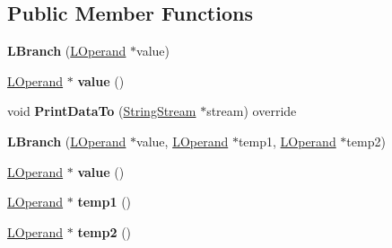 \subsection*{Public Member Functions}
\begin{DoxyCompactItemize}
\item 
{\bfseries L\+Branch} (\hyperlink{classv8_1_1internal_1_1_l_operand}{L\+Operand} $\ast$value)\hypertarget{classv8_1_1internal_1_1_l_branch_a47585b11adebace773ab1767c3882566}{}\label{classv8_1_1internal_1_1_l_branch_a47585b11adebace773ab1767c3882566}

\item 
\hyperlink{classv8_1_1internal_1_1_l_operand}{L\+Operand} $\ast$ {\bfseries value} ()\hypertarget{classv8_1_1internal_1_1_l_branch_ac4159865cc8843892cf7ee698ec9a586}{}\label{classv8_1_1internal_1_1_l_branch_ac4159865cc8843892cf7ee698ec9a586}

\item 
void {\bfseries Print\+Data\+To} (\hyperlink{classv8_1_1internal_1_1_string_stream}{String\+Stream} $\ast$stream) override\hypertarget{classv8_1_1internal_1_1_l_branch_a2b22ae6b02ec13469c60958c5e90593a}{}\label{classv8_1_1internal_1_1_l_branch_a2b22ae6b02ec13469c60958c5e90593a}

\item 
{\bfseries L\+Branch} (\hyperlink{classv8_1_1internal_1_1_l_operand}{L\+Operand} $\ast$value, \hyperlink{classv8_1_1internal_1_1_l_operand}{L\+Operand} $\ast$temp1, \hyperlink{classv8_1_1internal_1_1_l_operand}{L\+Operand} $\ast$temp2)\hypertarget{classv8_1_1internal_1_1_l_branch_ae58304306313d906bc06cdbca52ef455}{}\label{classv8_1_1internal_1_1_l_branch_ae58304306313d906bc06cdbca52ef455}

\item 
\hyperlink{classv8_1_1internal_1_1_l_operand}{L\+Operand} $\ast$ {\bfseries value} ()\hypertarget{classv8_1_1internal_1_1_l_branch_ac4159865cc8843892cf7ee698ec9a586}{}\label{classv8_1_1internal_1_1_l_branch_ac4159865cc8843892cf7ee698ec9a586}

\item 
\hyperlink{classv8_1_1internal_1_1_l_operand}{L\+Operand} $\ast$ {\bfseries temp1} ()\hypertarget{classv8_1_1internal_1_1_l_branch_ab195664932356ac1159a076ca6fdae8c}{}\label{classv8_1_1internal_1_1_l_branch_ab195664932356ac1159a076ca6fdae8c}

\item 
\hyperlink{classv8_1_1internal_1_1_l_operand}{L\+Operand} $\ast$ {\bfseries temp2} ()\hypertarget{classv8_1_1internal_1_1_l_branch_a50c97a1ec307f26464fa549298307dd0}{}\label{classv8_1_1internal_1_1_l_branch_a50c97a1ec307f26464fa549298307dd0}


\end{DoxyCompactItemize}
